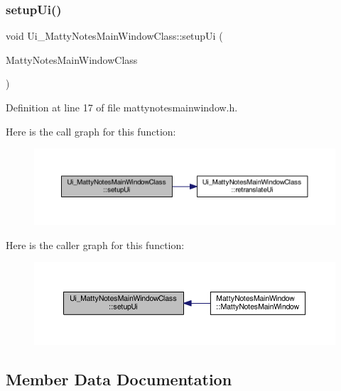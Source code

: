\subsubsection{\texorpdfstring{setup\+Ui()}{setupUi()}}
{\footnotesize\ttfamily void Ui\+\_\+\+Matty\+Notes\+Main\+Window\+Class\+::setup\+Ui (\begin{DoxyParamCaption}\item[{Q\+Main\+Window $\ast$}]{Matty\+Notes\+Main\+Window\+Class }\end{DoxyParamCaption})\hspace{0.3cm}{\ttfamily [inline]}}



Definition at line 17 of file mattynotesmainwindow.\+h.

Here is the call graph for this function\+:
\nopagebreak
\begin{figure}[H]
\begin{center}
\leavevmode
\includegraphics[width=350pt]{classUi__MattyNotesMainWindowClass_abae561e16be81d038b0fb3f8216a3444_cgraph}
\end{center}
\end{figure}
Here is the caller graph for this function\+:
\nopagebreak
\begin{figure}[H]
\begin{center}
\leavevmode
\includegraphics[width=350pt]{classUi__MattyNotesMainWindowClass_abae561e16be81d038b0fb3f8216a3444_icgraph}
\end{center}
\end{figure}


\subsection{Member Data Documentation}
\hypertarget{classUi__MattyNotesMainWindowClass_aef8d0ae934df8b942afffb11c3d2c5e7}{}\label{classUi__MattyNotesMainWindowClass_aef8d0ae934df8b942afffb11c3d2c5e7} 
